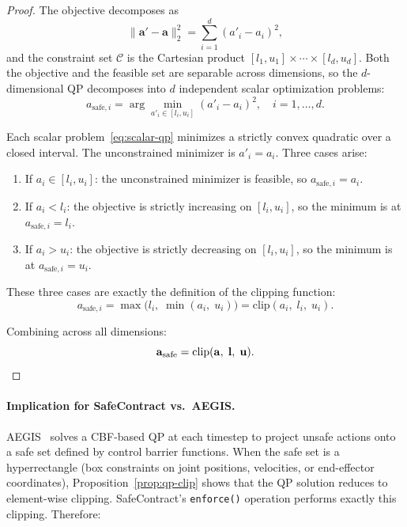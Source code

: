 \begin{proof}
The objective decomposes as
\[
  \|\mathbf{a}' - \mathbf{a}\|_2^2 = \sum_{i=1}^{d} (a'_i - a_i)^2,
\]
and the constraint set $\mathcal{C}$ is the Cartesian product $[l_1, u_1] \times \cdots \times [l_d, u_d]$.
Both the objective and the feasible set are separable across dimensions, so the
$d$-dimensional QP decomposes into $d$ independent scalar optimization problems:
\begin{equation}
  a_{\mathrm{safe},i} = \arg\min_{a'_i \in [l_i, u_i]} (a'_i - a_i)^2, \quad i = 1, \ldots, d.
  \label{eq:scalar-qp}
\end{equation}

Each scalar problem~\eqref{eq:scalar-qp} minimizes a strictly convex quadratic
over a closed interval. The unconstrained minimizer is $a'_i = a_i$. Three cases arise:

\begin{enumerate}
  \item If $a_i \in [l_i, u_i]$: the unconstrained minimizer is feasible, so $a_{\mathrm{safe},i} = a_i$.
  \item If $a_i < l_i$: the objective is strictly increasing on $[l_i, u_i]$, so the minimum is at $a_{\mathrm{safe},i} = l_i$.
  \item If $a_i > u_i$: the objective is strictly decreasing on $[l_i, u_i]$, so the minimum is at $a_{\mathrm{safe},i} = u_i$.
\end{enumerate}

These three cases are exactly the definition of the clipping function:
\begin{equation}
  a_{\mathrm{safe},i} = \max\bigl(l_i,\; \min(a_i,\; u_i)\bigr) = \mathrm{clip}(a_i,\; l_i,\; u_i).
\end{equation}

Combining across all dimensions:
\begin{equation}
  \mathbf{a}_{\mathrm{safe}} = \mathrm{clip}(\mathbf{a},\; \mathbf{l},\; \mathbf{u}). \qedhere
\end{equation}
\end{proof}

\paragraph{Implication for SafeContract vs.\ AEGIS.}
AEGIS~\cite{aegis} solves a CBF-based QP at each timestep to project unsafe actions
onto a safe set defined by control barrier functions. When the safe set is a
hyperrectangle (box constraints on joint positions, velocities, or end-effector
coordinates), Proposition~\ref{prop:qp-clip} shows that the QP solution reduces
to element-wise clipping. SafeContract's \texttt{enforce()} operation performs
exactly this clipping. Therefore:

